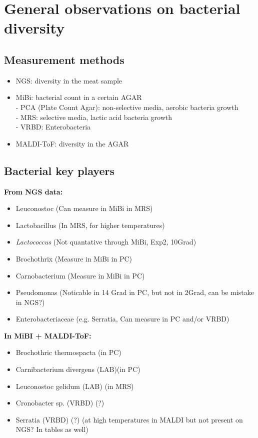 \documentclass[10pt,A4paper]{article}
\begin{document}
\tableofcontents
\section{General observations on bacterial diversity}
\subsection{Measurement methods}
\begin{itemize}
    \item NGS: diversity in the meat sample
    
    \item MiBi: bacterial count in a certain AGAR\\
        - PCA (Plate Count Agar): non-selective media, aerobic bacteria growth\\
        - MRS: selective media, lactic acid bacteria growth\\
        - VRBD: Enterobacteria

    \item MALDI-ToF: diversity in the AGAR

\end{itemize}

\subsection{Bacterial key players}
\textbf{From NGS data:}
\begin{itemize}
    \item Leuconostoc (Can measure in MiBi in MRS)
    \item Lactobacillus (In MRS, for higher temperatures)
    \item \textit{Lactococcus} (Not quantative through MiBi, Exp2, 10Grad)
    \item Brochothrix  (Measure in MiBi in PC)
    \item Carnobacterium (Measure in MiBi in PC)
    \item Pseudomonas (Noticable in 14 Grad in PC, but not in 2Grad, can be mistake in NGS?)
    \item Enterobacteriaceae (e.g. Serratia, Can measure in PC and/or VRBD)
\end{itemize}


\textbf{In MiBI + MALDI-ToF:}
\begin{itemize}
    \item Brochothric thermospacta (in PC)
    \item Carnibacterium divergens (LAB)(in PC)
    \item Leuconostoc gelidum (LAB) (in MRS)
    
    \item Cronobacter sp. (VRBD) (?)
    \item Serratia (VRBD) (?) (at high temperatures in MALDI but not present on NGS? In tables as well)
\end{itemize}
\end{document}
